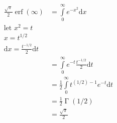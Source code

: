 \begin{align*} \frac{\sqrt\pi}2\operatorname{erf}(\infty)&=\int\limits_0^\infty e^{-x^2}\mathrm dx&\\ \text{let }x^2=t\\ x= t^{1/2}\\ \mathrm dx=\frac{t^{-1/2}}2\mathrm dt\\ &=\int\limits_0^\infty e^{-t}\frac{t^{-1/2}}{2}\mathrm dt\\ &=\frac12\int\limits_0^\infty t^{(1/2)-1}e^{-t}\mathrm dt\\ &=\frac12\operatorname \Gamma(1/2)\\ &=\frac{\sqrt\pi}2 \end{align*}